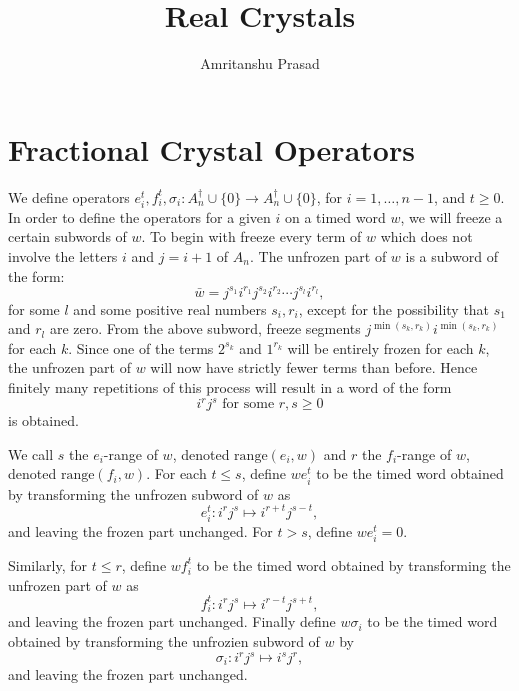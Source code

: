 \documentclass[12pt]{amsproc}
\title{Real Crystals}
\author{Amritanshu Prasad}
\newcommand{\range}{\mathrm{range}}
\theoremstyle{definition}
\begin{document}
\maketitle

\section{Fractional Crystal Operators}
\label{sec:frac-ops}
We define operators $e_i^t, f_i^t, \sigma_i:A_n^\dagger\cup \{0\}\to A_n^\dagger\cup \{0\}$, for $i=1,\dotsc,n-1$, and $t\geq 0$.
In order to define the operators for a given $i$ on a timed word $w$, we will freeze a certain subwords of $w$.
To begin with freeze every term of $w$ which does not involve the letters $i$ and $j=i+1$ of $A_n$.
The unfrozen part of $w$ is a subword of the form:
\begin{displaymath}
  \bar w = j^{s_1}i^{r_1}j^{s_2}i^{r_2}\dotsb j^{s_l}i^{r_l},
\end{displaymath}
for some $l$ and some positive real numbers $s_i, r_i$, except for the possibility that $s_1$ and $r_l$ are zero.
From the above subword, freeze segments $j^{\min(s_k,r_k)}i^{\min(s_k,r_k)}$ for each $k$.
Since one of the terms $2^{s_k}$ and $1^{r_k}$ will be entirely frozen for each $k$, the unfrozen part of $w$ will now have strictly fewer terms than before.
Hence finitely many repetitions of this process will result in a word of the form
\begin{displaymath}
  i^rj^s \text{ for some }r,s\geq 0
\end{displaymath}
is obtained.

We call $s$ the $e_i$-range of $w$, denoted $\range(e_i,w)$ and $r$ the $f_i$-range of $w$, denoted $\range(f_i,w)$.
For each $t\leq s$, define $we_i^t$ to be the timed word obtained by transforming the unfrozen subword of $w$ as
\begin{displaymath}
  e_i^t: i^rj^s\mapsto i^{r+t}j^{s-t},
\end{displaymath}
and leaving the frozen part unchanged.
For $t>s$, define $we_i^t=0$.

Similarly, for $t\leq r$, define $wf_i^t$ to be the timed word obtained by transforming the unfrozen part of $w$ as
\begin{displaymath}
  f_i^t: i^rj^s\mapsto i^{r-t}j^{s+t},
\end{displaymath}
and leaving the frozen part unchanged.
Finally define $w\sigma_i$ to be the timed word obtained by transforming the unfrozien subword of $w$ by
\begin{displaymath}
  \sigma_i:i^rj^s\mapsto i^sj^r,
\end{displaymath}
and leaving the frozen part unchanged.
\end{document}
